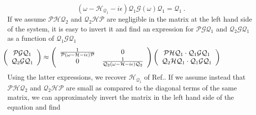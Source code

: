 \documentclass[12pt,a4paper,final]{iopart}
\begin{document}
\begin{equation}
(\omega-\mathcal{H}_{\mathcal{Q}_1}-i\epsilon)\mathcal{Q}_1\mathcal{G}(\omega)\mathcal{Q}_1 = \mathcal{Q}_1 \ .
\end{equation}
If we assume $\mathcal{P}\mathcal{H}\mathcal{Q}_2$ and $\mathcal{Q}_2\mathcal{H}\mathcal{P}$ are negligible in the matrix at the left hand side of the system, it is easy to invert it and find an expression for $\mathcal{P}\mathcal{G}\mathcal{Q}_1$ and $\mathcal{Q}_2\mathcal{G}\mathcal{Q}_1$ as a function of $\mathcal{Q}_1\mathcal{G}\mathcal{Q}_1$ 
\[
\hspace*{-2cm}
   \left( {\begin{array}{c}
            $$\mathcal{P}\mathcal{G}\mathcal{Q}_1$$ \\       
            $$\mathcal{Q}_2\mathcal{G}\mathcal{Q}_1$$ \\      
           \end{array} } \right) 
\approx
   \left( {\begin{array}{cc}
            $$\frac{1}{\mathcal{P}(\omega-\mathcal{H}-i\epsilon)\mathcal{P}}$$ & 0 \\       
            0 & $$\frac{1}{\mathcal{Q}_2(\omega-\mathcal{H}-i\epsilon)\mathcal{Q}_2}$$ \\      
           \end{array} } \right)
   \left( {\begin{array}{c}
            $$\mathcal{P}\mathcal{H}\mathcal{Q}_1\cdot\mathcal{Q}_1\mathcal{G}\mathcal{Q}_1$$ \\       
            $$\mathcal{Q}_2\mathcal{H}\mathcal{Q}_1\cdot\mathcal{Q}_1\mathcal{G}\mathcal{Q}_1$$ \\      
           \end{array} } \right)
\]
Using the latter expressions, we recover $\mathcal{H}_{\mathcal{Q}_1}$ of Ref.\cite{yoshida1983}. If we assume instead that  $\mathcal{P}\mathcal{H}\mathcal{Q}_2$ and $\mathcal{Q}_2\mathcal{H}\mathcal{P}$ are small as compared to the diagonal terms of the same matrix, we can approximately invert the matrix in the left hand side of the equation and find 
\end{document}
